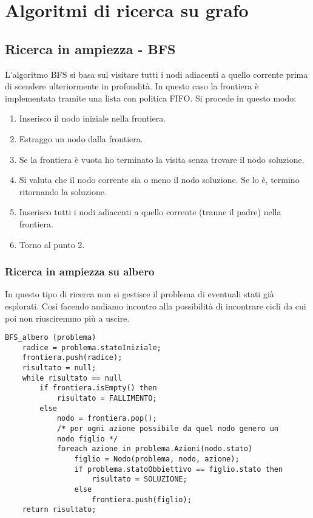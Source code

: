 \section{Algoritmi di ricerca su grafo}
\subsection{Ricerca in ampiezza - BFS}
L'algoritmo BFS si basa sul visitare tutti i nodi adiacenti a quello corrente prima di
scendere ulteriormente in profondit\`a. In questo caso la frontiera \`e implementata
tramite una lista con politica FIFO. Si procede in questo modo:
\begin{enumerate}
	\item Inserisco il nodo iniziale nella frontiera.
	\item Estraggo un nodo dalla frontiera.
	\item Se la frontiera \`e vuota ho terminato la visita senza trovare il nodo soluzione.
	\item Si valuta che il nodo corrente sia o meno il nodo soluzione. Se lo \`e, termino
	      ritornando la soluzione.
	\item Inserisco tutti i nodi adiacenti a quello corrente (tranne il padre) nella
	      frontiera.
	\item Torno al punto 2.
\end{enumerate}

\subsubsection{Ricerca in ampiezza su albero}
In questo tipo di ricerca non si gestisce il problema di eventuali stati gi\`a esplorati.
Cos\`i facendo andiamo incontro alla possibilit\`a di incontrare cicli da cui poi non
riusciremmo pi\`u a uscire.
\begin{lstlisting}[style=pseudo-style]
BFS_albero (problema)
	radice = problema.statoIniziale;
	frontiera.push(radice);
	risultato = null;
	while risultato == null
		if frontiera.isEmpty() then
			risultato = FALLIMENTO;
		else
			nodo = frontiera.pop();
			/* per ogni azione possibile da quel nodo genero un 
			nodo figlio */
			foreach azione in problema.Azioni(nodo.stato)
				figlio = Nodo(problema, nodo, azione);
				if problema.statoObbiettivo == figlio.stato then
					risultato = SOLUZIONE;
				else
					frontiera.push(figlio);
	return risultato;
\end{lstlisting}

